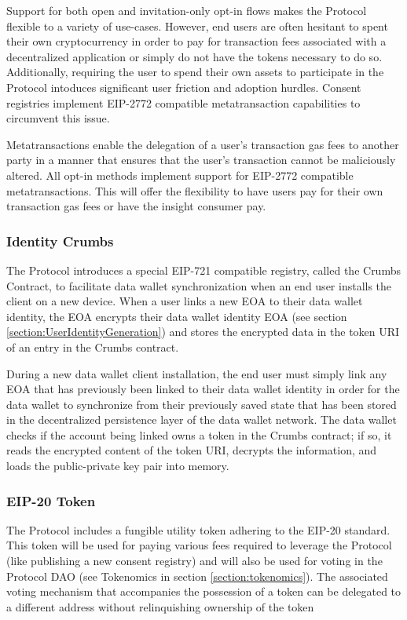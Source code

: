 Support for both open and invitation-only opt-in flows makes the Protocol flexible to a variety of use-cases. However, end users are often hesitant to 
spent their own cryptocurrency in order to pay for transaction fees associated with a decentralized application or simply do not have the tokens 
necessary to do so. Additionally, requiring the user to spend their own assets to participate in the Protocol intoduces significant user friction and
adoption hurdles. Consent registries implement EIP-2772 compatible metatransaction capabilities to circumvent this issue. 

Metatransactions enable the delegation of a user's transaction gas fees to another party in a manner that ensures that the user's transaction cannot be maliciously altered. All opt-in methods  implement support for EIP-2772 compatible metatransactions. This will offer the 
flexibility to have users pay for their own transaction gas fees or have the insight consumer pay.  

\subsubsection{Identity Crumbs}
\label{section:Crumbs}

The Protocol introduces a special EIP-721 compatible registry, called the Crumbs Contract, to facilitate data wallet synchronization when an end user 
installs the client on a new device. When a user links a new EOA to their data wallet identity, the EOA encrypts their data wallet identity EOA (see section
\ref{section:UserIdentityGeneration}) and stores the encrypted data in the token URI of an entry in the Crumbs contract. 

During a new data wallet client installation, the end user must simply link any EOA that has previously been linked to their data wallet identity in order for the data 
wallet to synchronize from their previously saved state that has been stored in the decentralized persistence layer of the data wallet network. The data wallet
checks if the account being linked owns a token in the Crumbs contract; if so, it reads the encrypted content of the token URI, decrypts the information, and loads 
the public-private key pair into memory. 

\subsubsection{EIP-20 Token}
\label{section:Token}
The Protocol includes a fungible utility token adhering to the EIP-20 standard. This token will be used for paying various fees required to leverage
the Protocol (like publishing a new consent registry) and will also be used for voting in the Protocol DAO (see Tokenomics in section \ref{section:tokenomics}). The associated voting mechanism that 
accompanies the possession of a token can be delegated to a different address without relinquishing ownership of the token

